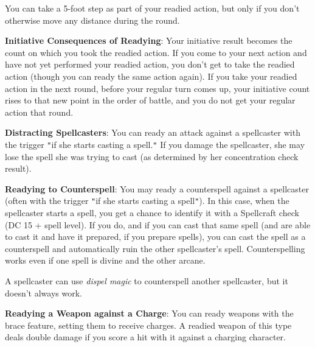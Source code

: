 You can take a 5-foot step as part of your readied action, but only if you don't otherwise move any distance during the round. 
				
\textbf{Initiative Consequences of Readying}: Your initiative result becomes the count on which you took the readied action. If you come to your next action and have not yet performed your readied action, you don't get to take the readied action (though you can ready the same action again). If you take your readied action in the next round, before your regular turn comes up, your initiative count rises to that new point in the order of battle, and you do not get your regular action that round.
				
\textbf{Distracting Spellcasters}: You can ready an attack against a spellcaster with the trigger \texttt{{}"{}}if she starts casting a spell.\texttt{{}"{}} If you damage the spellcaster, she may lose the spell she was trying to cast (as determined by her concentration check result).
				
\textbf{Readying to Counterspell}: You may ready a counterspell against a spellcaster (often with the trigger \texttt{{}"{}}if she starts casting a spell\texttt{{}"{}}). In this case, when the spellcaster starts a spell, you get a chance to identify it with a Spellcraft check (DC 15 + spell level). If you do, and if you can cast that same spell (and are able to cast it and have it prepared, if you prepare spells), you can cast the spell as a counterspell and automatically ruin the other spellcaster's spell. Counterspelling works even if one spell is divine and the other arcane.
				
A spellcaster can use \textit{dispel magic }to counterspell another spellcaster, but it doesn't always work.
				
\textbf{Readying a Weapon against a Charge}: You can ready weapons with the brace feature, setting them to receive charges. A readied weapon of this type deals double damage if you score a hit with it against a charging character.
			
        	
